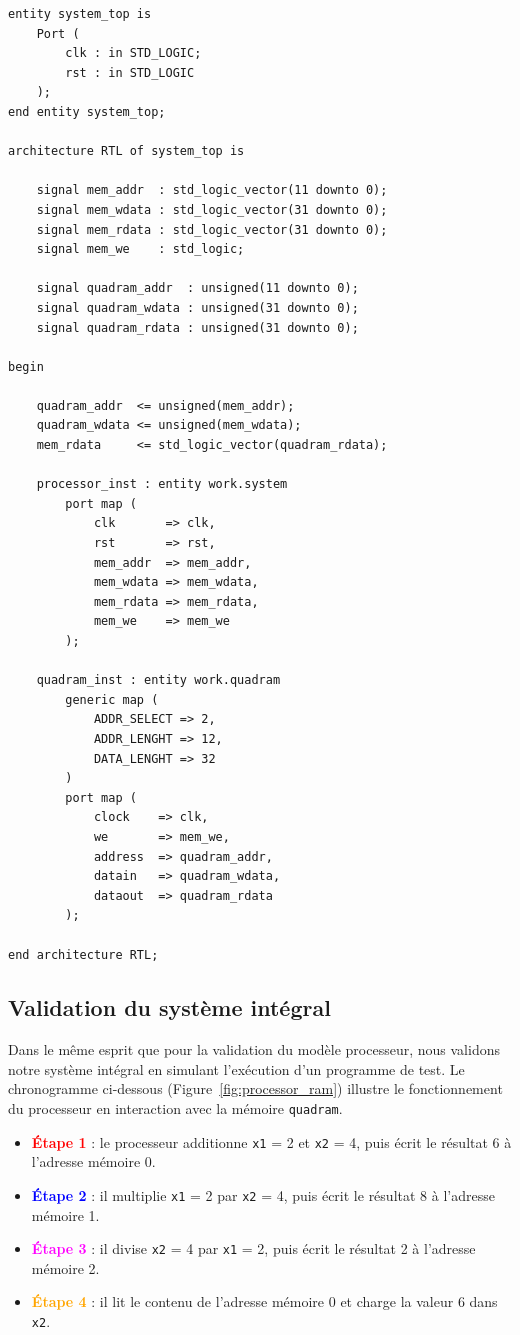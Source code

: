 \begin{lstlisting}[caption={Extrait du Top-Level système}, label={lst:top_level}]
entity system_top is
    Port (
        clk : in STD_LOGIC;
        rst : in STD_LOGIC
    );
end entity system_top;

architecture RTL of system_top is

    signal mem_addr  : std_logic_vector(11 downto 0);
    signal mem_wdata : std_logic_vector(31 downto 0);
    signal mem_rdata : std_logic_vector(31 downto 0);
    signal mem_we    : std_logic;

    signal quadram_addr  : unsigned(11 downto 0);
    signal quadram_wdata : unsigned(31 downto 0);
    signal quadram_rdata : unsigned(31 downto 0);

begin

    quadram_addr  <= unsigned(mem_addr);
    quadram_wdata <= unsigned(mem_wdata);
    mem_rdata     <= std_logic_vector(quadram_rdata);

    processor_inst : entity work.system
        port map (
            clk       => clk,
            rst       => rst,
            mem_addr  => mem_addr,
            mem_wdata => mem_wdata,
            mem_rdata => mem_rdata,
            mem_we    => mem_we
        );

    quadram_inst : entity work.quadram
        generic map (
            ADDR_SELECT => 2,
            ADDR_LENGHT => 12,
            DATA_LENGHT => 32
        )
        port map (
            clock    => clk,
            we       => mem_we,
            address  => quadram_addr,
            datain   => quadram_wdata,
            dataout  => quadram_rdata
        );

end architecture RTL;
\end{lstlisting}

\subsection{Validation du système intégral}

Dans le même esprit que pour la validation du modèle processeur, nous validons notre système intégral en simulant l'exécution d'un programme de test. 
Le chronogramme ci-dessous (Figure~\ref{fig:processor_ram}) illustre le fonctionnement du processeur en interaction avec la mémoire \texttt{quadram}.
\\

\begin{itemize}
    \item \textcolor{red}{\textbf{Étape 1}} : le processeur additionne \texttt{x1} = 2 et \texttt{x2} = 4, puis écrit le résultat 6 à l'adresse mémoire 0.
    \item \textcolor{blue}{\textbf{Étape 2}} : il multiplie \texttt{x1} = 2 par \texttt{x2} = 4, puis écrit le résultat 8 à l'adresse mémoire 1.
    \item \textcolor{magenta}{\textbf{Étape 3}} : il divise \texttt{x2} = 4 par \texttt{x1} = 2, puis écrit le résultat 2 à l'adresse mémoire 2.
    \item \textcolor{orange}{\textbf{Étape 4}} : il lit le contenu de l'adresse mémoire 0 et charge la valeur 6 dans \texttt{x2}.
\end{itemize}

